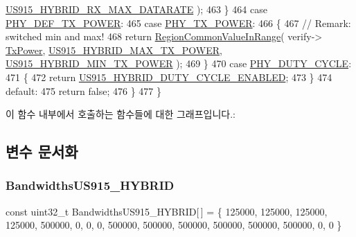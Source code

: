 \begin{DoxyCode}
      \mbox{\hyperlink{group___r_e_g_i_o_n_u_s915_h_y_b_ga10a143c061143776288b241e17c1b58d}{US915\_HYBRID\_RX\_MAX\_DATARATE}} );
463         \}
464         \textcolor{keywordflow}{case} \mbox{\hyperlink{group___r_e_g_i_o_n_gga51cbe8f5433d914fe9cf81b451de2c2da18ae0d314f20c212f9e40207099ab1bb}{PHY\_DEF\_TX\_POWER}}:
465         \textcolor{keywordflow}{case} \mbox{\hyperlink{group___r_e_g_i_o_n_gga51cbe8f5433d914fe9cf81b451de2c2da0dceb30b79f1bae301afd5406a86d6f3}{PHY\_TX\_POWER}}:
466         \{
467             \textcolor{comment}{// Remark: switched min and max!}
468             \textcolor{keywordflow}{return} \mbox{\hyperlink{group___r_e_g_i_o_n_c_o_m_m_o_n_gafdd1c80d953e18d755a631b72a9c3bd3}{RegionCommonValueInRange}}( verify->
      \mbox{\hyperlink{unionu_verify_params_a037b4f849fa8ed4aa1d3c58aef2b28ec}{TxPower}}, \mbox{\hyperlink{group___r_e_g_i_o_n_u_s915_h_y_b_ga94a1ed1e5cca1f05f0ac4916e164f529}{US915\_HYBRID\_MAX\_TX\_POWER}}, 
      \mbox{\hyperlink{group___r_e_g_i_o_n_u_s915_h_y_b_ga0aece8c836bf5bf19a28589cb3cda70e}{US915\_HYBRID\_MIN\_TX\_POWER}} );
469         \}
470         \textcolor{keywordflow}{case} \mbox{\hyperlink{group___r_e_g_i_o_n_gga51cbe8f5433d914fe9cf81b451de2c2dac66308571e624ecc28c79ee0deab8cf0}{PHY\_DUTY\_CYCLE}}:
471         \{
472             \textcolor{keywordflow}{return} \mbox{\hyperlink{group___r_e_g_i_o_n_u_s915_h_y_b_ga7d99e44bc983c9f9e453640cc13712bf}{US915\_HYBRID\_DUTY\_CYCLE\_ENABLED}};
473         \}
474         \textcolor{keywordflow}{default}:
475             \textcolor{keywordflow}{return} \textcolor{keyword}{false};
476     \}
477 \}
\end{DoxyCode}
이 함수 내부에서 호출하는 함수들에 대한 그래프입니다.\+:


\subsection{변수 문서화}
\mbox{\label{group___r_e_g_i_o_n_u_s915_h_y_b_gada3976d142cb9c990e9af2567ff8ecca}} 
\subsubsection{\texorpdfstring{Bandwidths\+U\+S915\+\_\+\+H\+Y\+B\+R\+ID}{BandwidthsUS915\_HYBRID}}
{\footnotesize\ttfamily const uint32\+\_\+t Bandwidths\+U\+S915\+\_\+\+H\+Y\+B\+R\+ID\mbox{[}$\,$\mbox{]} = \{ 125000, 125000, 125000, 125000, 500000, 0, 0, 0, 500000, 500000, 500000, 500000, 500000, 500000, 0, 0 \}\hspace{0.3cm}{\ttfamily [static]}}

